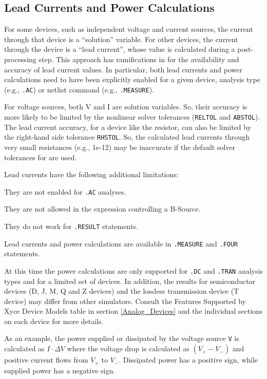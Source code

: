 \subsection{Lead Currents and Power Calculations}
\label{leadCurrentPowerCalculations}
  For some devices,
such as independent voltage and current sources, the current through
that device is a ``solution'' variable.  For other devices, the
current through the device is a ``lead current'', whose value is
calculated during a post-processing step.  This approach has
ramifications in \Xyce{} for the availability and accuracy of lead
current values.  In particular, both lead currents and power
calculations need to have been explicitly enabled for a given device,
analysis type (e.g., \texttt{.AC}) or netlist command (e.g.,
\texttt{.MEASURE}).

For voltage sources, both V and I are solution variables.  So, their
accuracy is more likely to be limited by the nonlinear solver
tolerances (\texttt{RELTOL} and \texttt{ABSTOL}).  The lead current
accuracy, for a device like the resistor, can also be limited by the
right-hand side tolerance \texttt{RHSTOL}.  So, the calculated lead
currents through very small resistances (e.g., 1e-12) may be
inaccurate if the default solver tolerances for \Xyce{} are used.

Lead currents have the following additional limitations:
\begin{XyceItemize}
\item They are not enabled for \texttt{.AC} analyses.
\item They are not allowed in the expression controlling a B-Source.
\item They do not work for \texttt{.RESULT} statements.
\end{XyceItemize}

Lead currents and power calculations are available in
\texttt{.MEASURE} and \texttt{.FOUR} statements.

At this time the power calculations are only supported for {\tt .DC}
and {\tt .TRAN} analysis types and for a limited set of devices. In
addition, the results for semiconductor devices (D, J, M, Q and Z
devices) and the lossless transmission device (T device) may differ
from other simulators.  Consult the Features Supported by Xyce Device
Models table in section \ref{Analog_Devices} and the individual
sections on each device for more details.

As an example, the power supplied or dissipated by the voltage source
{\tt V} is calculated as $I \cdot \Delta V$ where the voltage drop is
calculated as $(V_+ - V_-)$ and positive current flows from $V_+$ to
$V_-$.  Dissipated power has a positive sign, while supplied power has
a negative sign.

